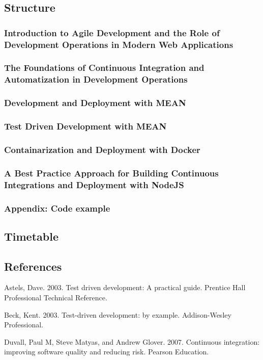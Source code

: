 \subsection{Structure}
\subsubsection{Introduction to Agile Development and the Role of Development Operations in Modern Web Applications}
\subsubsection{The Foundations of Continuous Integration and Automatization in Development Operations}
\subsubsection{Development and Deployment with MEAN}
\subsubsection{Test Driven Development with MEAN}
\subsubsection{Containarization and Deployment with Docker}
\subsubsection{A Best Practice Approach for Building Continuous Integrations and Deployment with NodeJS}
\subsubsection{Appendix: Code example}

\subsection{Timetable}

\subsection{References}

Astels, Dave. 2003. Test driven development: A practical guide. Prentice Hall Professional Technical Reference.

Beck, Kent. 2003. Test-driven development: by example. Addison-Wesley Professional.

Duvall, Paul M, Steve Matyas, and Andrew Glover. 2007. Continuous integration: improving software quality and reducing risk. Pearson Education.

